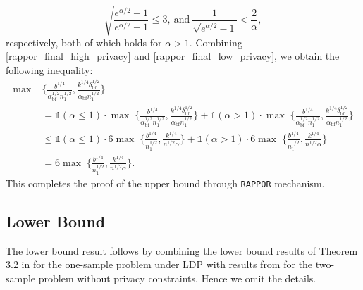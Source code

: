 \documentclass[twoside,11pt]{article}
\newcommand{\normSqMultinomMax}{b}
\newcommand{\alphabetSize}{k} %
\newcommand{\sampleSize}{n}
\newcommand{\privacyParameter}{\alpha} %
\newcommand{\privacyParameterrappor}{\privacyParameter_{\mathrm{bf}}}
\newcommand{\smallNumber}{\delta}
\newcommand{\smallNumberrappor}{\smallNumber_{\mathrm{bf}}}
\begin{document}
\begin{appendix}
\begin{itemize}
	\begin{equation*}
		\sqrt{\frac{e^{\alpha/2}+1}{e^{\alpha/2}-1}}
		\leq 3,~\text{and}~
		\frac{1}{\sqrt{e^{\privacyParameter/2}-1}} < \frac{2}{\privacyParameter}
		,
	\end{equation*}
	respectively, both of which holds for $\privacyParameter>1$.
	Combining \eqref{rappor_final_high_privacy} and \eqref{rappor_final_low_privacy}, we obtain the following inequality:
	\begin{align*}
		\max \;&
		\biggl\{
		\frac{
			\normSqMultinomMax^{1/4}
		}{
			\privacyParameterrappor^{1/2}
			\sampleSize_1^{1/2}}
		,
		\frac{
			\alphabetSize^{1/4}
			\smallNumberrappor^{1/2} 
		}{
			\privacyParameterrappor
			\sampleSize_1^{1/2}}
		\biggr\}
		\\&=
		\mathds{1}(\alpha \leq 1) \cdot
		\max \;
		\biggl\{
		\frac{
			\normSqMultinomMax^{1/4}
		}{
			\privacyParameterrappor^{1/2}
			\sampleSize_1^{1/2}}
		,
		\frac{
			\alphabetSize^{1/4}
			\smallNumberrappor^{1/2} 
		}{
			\privacyParameterrappor
			\sampleSize_1^{1/2}}
		\biggr\}
		+
		\mathds{1}(\alpha > 1) \cdot
		\max \;
		\biggl\{
		\frac{
			\normSqMultinomMax^{1/4}
		}{
			\privacyParameterrappor^{1/2}
			\sampleSize_1^{1/2}}
		,
		\frac{
			\alphabetSize^{1/4}
			\smallNumberrappor^{1/2} 
		}{
			\privacyParameterrappor
			\sampleSize_1^{1/2}}
		\biggr\}
		\\&\leq
		\mathds{1}(\alpha \leq 1) \cdot
		6
		\max \;
		\biggl\{
		\frac{b^{1/4}}{\sampleSize_1^{1/2}},
		\frac{k^{1/4}}{
			n^{1/2}
			\privacyParameter
		}
		\biggr\}
		+
		\mathds{1}(\alpha > 1) \cdot
		6
		\max \;
		\biggl\{
		\frac{b^{1/4}}{\sampleSize_1^{1/2}},
		\frac{k^{1/4}}{
			n^{1/2}
			\privacyParameter
		}
		\biggr\}
		\\&=
		6
		\max \;
		\biggl\{
		\frac{b^{1/4}}{\sampleSize_1^{1/2}},
		\frac{k^{1/4}}{
			n^{1/2}
			\privacyParameter
		}
		\biggr\}.
	\end{align*}
	This completes the proof of the upper bound through \texttt{RAPPOR} mechanism.
\end{itemize}
	
	\subsection{Lower Bound}
	The lower bound result follows by combining the lower bound results of Theorem 3.2 in \citep{Lam-Weil2021MinimaxConstraint} for the one-sample problem under LDP with results from \citep{chan2014optimal,kim_minimax_2022} for the two-sample problem without privacy constraints. Hence we omit the details. 
	

\end{appendix}
\end{document}
